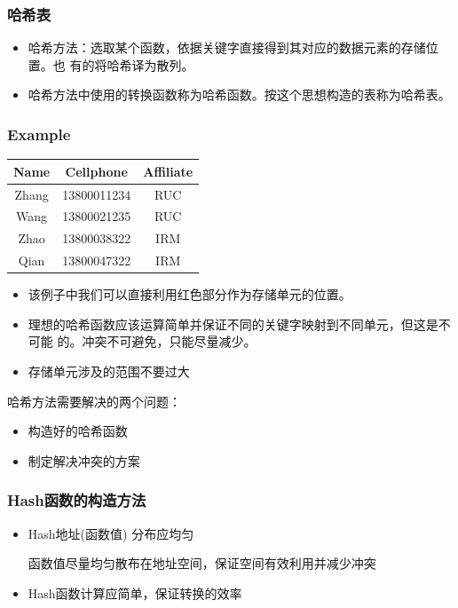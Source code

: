 \begin{frame}[fragile]
  \frametitle{哈希表}
  \begin{itemize}
  \item 哈希方法：选取某个函数，依据关键字直接得到其对应的数据元素的存储位置。也
    有的将哈希译为散列。
  \item 哈希方法中使用的转换函数称为哈希函数。按这个思想构造的表称为哈希表。
  \end{itemize}
\end{frame}

\begin{frame}[fragile]
  \frametitle{Example}
  \begin{tabular}{| c | c | c | }
    \hline
    Name & Cellphone & Affiliate \\ \hline
    Zhang & 138{\color{red}0001}1234 & RUC \\ \hline
    Wang & 138{\color{red}0002}1235 & RUC \\ \hline
    Zhao & 138{\color{red}0003}8322 & IRM \\ \hline
    Qian & 138{\color{red}0004}7322 & IRM \\ \hline
  \end{tabular}

  \begin{itemize}
  \item 该例子中我们可以直接利用红色部分作为存储单元的位置。
  \item 理想的哈希函数应该运算简单并保证不同的关键字映射到不同单元，但这是不可能
    的。冲突不可避免，只能尽量减少。
  \item 存储单元涉及的范围不要过大
  \end{itemize}

  哈希方法需要解决的两个问题：
  \begin{itemize}
  \item 构造好的哈希函数
  \item 制定解决冲突的方案
  \end{itemize}
\end{frame}

\begin{frame}[fragile]
  \frametitle{Hash函数的构造方法}
  \begin{itemize}
  \item Hash地址(函数值) 分布应均匀

    函数值尽量均匀散布在地址空间，保证空间有效利用并减少冲突
  \item Hash函数计算应简单，保证转换的效率
  \end{itemize}
\end{frame}

